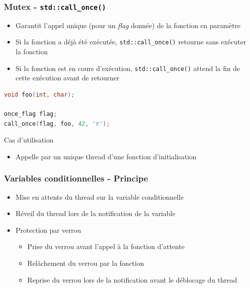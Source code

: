 \documentclass[C++.tex]{subfiles}
\begin{document}
\begin{frame}[fragile]
	\frametitle{Mutex - \lstinline|std::call_once()|}
	\begin{itemize}
		\item Garantit l'appel unique (pour un \textit{flag} donnée) de la fonction en paramètre
		\item Si la fonction a déjà été exécutée, \lstinline|std::call_once()| retourne sans exécuter la fonction
		\item Si la fonction est en cours d'exécution, \lstinline|std::call_once()| attend la fin de cette exécution avant de retourner
	\end{itemize}

	\begin{lstlisting}[language=C++]
void foo(int, char);

once_flag flag;
call_once(flag, foo, 42, 'r');\end{lstlisting}

	\begin{block}{Cas d'utilisation}
		\begin{itemize}
			\item Appelle par un unique thread d'une fonction d'initialisation
		\end{itemize}
	\end{block}
\end{frame}

\begin{frame}[fragile]
	\frametitle{Variables conditionnelles - Principe}
	\begin{itemize}
		\item Mise en attente du thread sur la variable conditionnelle
		\item Réveil du thread lors de la notification de la variable
		\item Protection par verrou
		\begin{itemize}
			\item Prise du verrou avant l'appel à la fonction d'attente
			\item Relâchement du verrou par la fonction
			\item Reprise du verrou lors de la notification avant le déblocage du thread
		\end{itemize}
	\end{itemize}
\end{frame}
\end{document}

